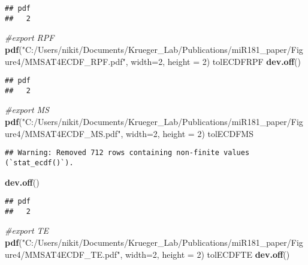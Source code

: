 \documentclass[
]{article}
\newenvironment{Shaded}{\begin{snugshade}}{\end{snugshade}}
\newcommand{\AttributeTok}[1]{\textcolor[rgb]{0.13,0.29,0.53}{#1}}
\newcommand{\CommentTok}[1]{\textcolor[rgb]{0.56,0.35,0.01}{\textit{#1}}}
\newcommand{\DecValTok}[1]{\textcolor[rgb]{0.00,0.00,0.81}{#1}}
\newcommand{\FunctionTok}[1]{\textcolor[rgb]{0.13,0.29,0.53}{\textbf{#1}}}
\newcommand{\NormalTok}[1]{#1}
\newcommand{\StringTok}[1]{\textcolor[rgb]{0.31,0.60,0.02}{#1}}
\begin{document}
\begin{verbatim}
## pdf 
##   2
\end{verbatim}

\begin{Shaded}
\begin{Highlighting}[]
\CommentTok{\#export RPF}
\FunctionTok{pdf}\NormalTok{(}\StringTok{"C:/Users/nikit/Documents/Krueger\_Lab/Publications/miR181\_paper/Figure4/MMSAT4ECDF\_RPF.pdf"}\NormalTok{, }\AttributeTok{width=}\DecValTok{2}\NormalTok{, }\AttributeTok{height =} \DecValTok{2}\NormalTok{)}
\NormalTok{tolECDFRPF}
\FunctionTok{dev.off}\NormalTok{()}
\end{Highlighting}
\end{Shaded}

\begin{verbatim}
## pdf 
##   2
\end{verbatim}

\begin{Shaded}
\begin{Highlighting}[]
\CommentTok{\#export MS}
\FunctionTok{pdf}\NormalTok{(}\StringTok{"C:/Users/nikit/Documents/Krueger\_Lab/Publications/miR181\_paper/Figure4/MMSAT4ECDF\_MS.pdf"}\NormalTok{, }\AttributeTok{width=}\DecValTok{2}\NormalTok{, }\AttributeTok{height =} \DecValTok{2}\NormalTok{)}
\NormalTok{tolECDFMS}
\end{Highlighting}
\end{Shaded}

\begin{verbatim}
## Warning: Removed 712 rows containing non-finite values (`stat_ecdf()`).
\end{verbatim}

\begin{Shaded}
\begin{Highlighting}[]
\FunctionTok{dev.off}\NormalTok{()}
\end{Highlighting}
\end{Shaded}

\begin{verbatim}
## pdf 
##   2
\end{verbatim}

\begin{Shaded}
\begin{Highlighting}[]
\CommentTok{\#export TE}
\FunctionTok{pdf}\NormalTok{(}\StringTok{"C:/Users/nikit/Documents/Krueger\_Lab/Publications/miR181\_paper/Figure4/MMSAT4ECDF\_TE.pdf"}\NormalTok{, }\AttributeTok{width=}\DecValTok{2}\NormalTok{, }\AttributeTok{height =} \DecValTok{2}\NormalTok{)}
\NormalTok{tolECDFTE}
\FunctionTok{dev.off}\NormalTok{()}
\end{Highlighting}
\end{Shaded}
\end{document}
